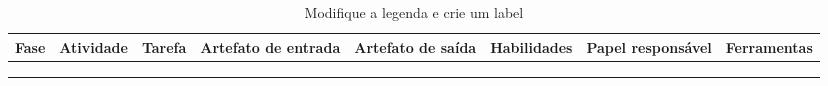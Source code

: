 \begin{table}[h!] %
\centering
\caption{Modifique a legenda e crie um label}
\label{tab_visao_estatica} %
\begin{tabular}{|l|l|l|l|l|l|l|l|}
\hline
\textbf{Fase} & \textbf{Atividade} & \textbf{Tarefa} & \textbf{Artefato de entrada} & \textbf{Artefato de saída} & \textbf{Habilidades} & \textbf{Papel responsável} & \textbf{Ferramentas} \\ \hline
 &  &  &  &  &  &  &  \\ \hline
 &  &  &  &  &  &  &  \\ \hline
 &  &  &  &  &  &  &  \\ \hline
\end{tabular}
\end{table}